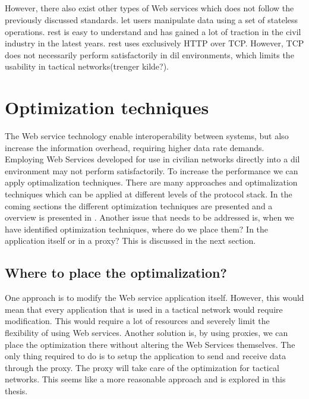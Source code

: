 \documentclass[USenglish]{ifimaster}
\begin{document}
\subsection{}
\label{rest}
However, there also exist other types of Web services which does not follow the
previously discussed standards.  let users manipulate data
using a set of stateless operations. \gls{rest} is easy to understand and has
gained a lot of traction in the civil industry in the latest years. \gls{rest}
uses exclusively HTTP over TCP. However, TCP does not necessarily perform
satisfactorily in \gls{dil} environments, which limits the usability in tactical
networks(trenger kilde?).


\section{Optimization techniques}
The Web service technology enable interoperability between systems, but also
increase the information overhead, requiring higher data rate demands. Employing
Web Services developed for use in civilian networks directly into a \gls{dil}
environment may not perform satisfactorily. To increase the performance we can
apply optimalization techniques. There are many approaches and optimalization
techniques which can be applied at different levels of the protocol stack. In
the coming sections the different optimization techniques are presented and a
overview is presented in . Another issue
that needs to be addressed is, when we have identified optimization techniques,
where do we place them? In the application itself or in a proxy? This is
discussed in the next section.

\subsection{Where to place the optimalization?}
One approach is to modify the Web service application itself. However, this
would mean that every application that is used in a tactical network would
require modification. This would require a lot of resources and severely limit
the flexibility of using Web services. Another solution is, by using proxies, we
can place the optimization there without altering the Web Services themselves.
The only thing required to do is to setup the application to send and receive
data through the proxy. The proxy will take care of the optimization for
tactical networks. This seems like a more reasonable approach and is explored in
this thesis.
\end{document}
